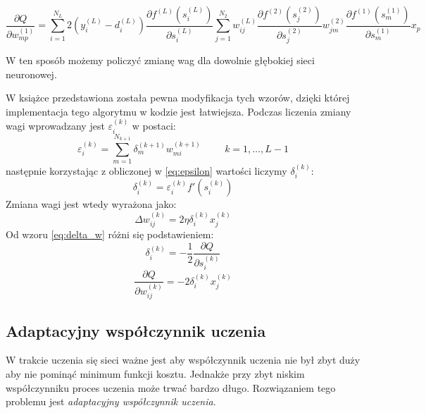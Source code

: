 \documentclass[a4paper,12pt]{article}
\numberwithin{equation}{section}
\begin{document}
\begin{equation}
    \frac{\partial Q}{\partial w_{mp}^{(1)}} = \sum_{i=1}^{N_L} 2(y_i^{(L)} - d^{(L)}_i) \frac{\partial f^{(L)}(s_i^{(L)})}{\partial s^{(L)}_i} \sum_{j=1}^{N_2} w^{(L)}_{ij} \frac{\partial f^{(2)}(s_j^{(2)})}{\partial s^{(2)}_j} w^{(2)}_{jm} \frac{\partial f^{(1)}(s_m^{(1)})}{\partial s_m^{(1)}} x_p
\end{equation}

W ten sposób możemy policzyć zmianę wag dla dowolnie głębokiej sieci neuronowej.

W książce \cite{book_rutkowski} przedstawiona została pewna modyfikacja tych wzorów, dzięki której implementacja tego algorytmu w kodzie jest łatwiejsza. Podczas liczenia zmiany wagi wprowadzany jest $\varepsilon_i^{(k)}$ w postaci:
\begin{equation}
    \label{eq:epsilon}
    \varepsilon_i^{(k)}=\sum_{m=1}^{N_{k+1}}\delta^{(k+1)}_m w_{mi}^{(k+1)} \hspace{1cm} k=1,\dots,L-1
\end{equation}
następnie korzystając z obliczonej w \ref{eq:epsilon} wartości liczymy $\delta_i^{(k)}$:
\begin{equation}
    \delta_i^{(k)} = \varepsilon_i^{(k)} f'(s_i^{(k)})
\end{equation}
Zmiana wagi jest wtedy wyrażona jako:
\begin{equation}
    \Delta w_{ij}^{(k)} = 2 \eta \delta_i^{(k)} x_j^{(k)}
\end{equation}
Od wzoru \ref{eq:delta_w} różni się podstawieniem:
\begin{equation}
    \delta_i^{(k)} = -\frac{1}{2} \frac{\partial Q}{\partial s_i^{(k)}}
\end{equation}
\begin{equation}
    \frac{\partial Q}{\partial w_{ij}^{(k)}} = -2 \delta_i^{(k)} x_j^{(k)}
\end{equation}


\subsection{Adaptacyjny współczynnik uczenia}
\label{subsec:adaptive_lr}
W trakcie uczenia się sieci ważne jest aby współczynnik uczenia nie był zbyt duży aby nie pominąć minimum funkcji kosztu. Jednakże przy zbyt niskim współczynniku proces uczenia może trwać bardzo długo. Rozwiązaniem tego problemu jest \textit{adaptacyjny współczynnik uczenia}.
\end{document}
